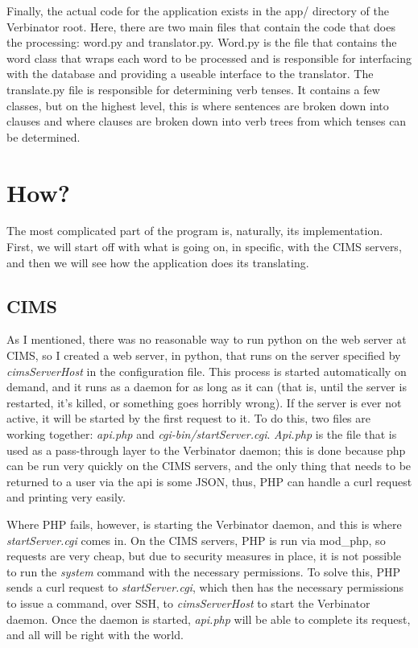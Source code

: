 \documentclass[12pt]{article}
\begin{document}
Finally, the actual code for the application exists in the app/ directory of the Verbinator root.  Here,
there are two main files that contain the code that does the processing: word.py and translator.py.
Word.py is the file that contains the word class that wraps each word to be processed and is responsible
for interfacing with the database and providing a useable interface to the translator.  The translate.py
file is responsible for determining verb tenses.  It contains a few classes, but on the highest level,
this is where sentences are broken down into clauses and where clauses are broken down into verb
trees from which tenses can be determined.

\section{How?}

The most complicated part of the program is, naturally, its implementation.  First, we will start off
with what is going on, in specific, with the CIMS servers, and then we will see how the application
does its translating.

\subsection{CIMS}

As I mentioned, there was no reasonable way to run python on the web server at CIMS, so I created a
web server, in python, that runs on the server specified by \emph{cimsServerHost} in the configuration
file.  This process is started automatically on demand, and it runs as a daemon for as long as it can
(that is, until the server is restarted, it's killed, or something goes horribly wrong).  If the server
is ever not active, it will be started by the first request to it. To do this, two files are working
together: \emph{api.php} and \emph{cgi-bin/startServer.cgi}. \emph{Api.php} is the file that is used as a 
pass-through layer to the Verbinator daemon; this is done because php can be run very quickly on the
CIMS servers, and the only thing that needs to be returned to a user via the api is some JSON, thus,
PHP can handle a curl request and printing very easily.

Where PHP fails, however, is starting the Verbinator daemon, and this is where \emph{startServer.cgi}
comes in.  On the CIMS servers, PHP is run via mod\_php, so requests are very cheap, but due to security
measures in place, it is not possible to run the \emph{system} command with the necessary permissions.
To solve this, PHP sends a curl request to \emph{startServer.cgi}, which then has the necessary
permissions to issue a command, over SSH, to \emph{cimsServerHost} to start the Verbinator daemon. Once
the daemon is started, \emph{api.php} will be able to complete its request, and all will be right with
the world.
\end{document}
